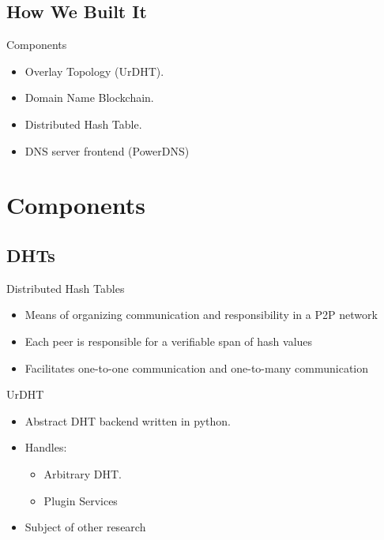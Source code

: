 \documentclass[11pt]{beamer}
\begin{document}
\subsection{How We Built It}

\begin{frame}{Components}

	\begin{itemize}
	
		\item Overlay Topology (UrDHT).
		\item Domain Name Blockchain. 
		\item Distributed Hash Table.
		\item DNS server frontend (PowerDNS)
	\end{itemize}
\end{frame}



\section{Components}

\subsection{DHTs}
\begin{frame}{Distributed Hash Tables}

	\begin{itemize}
		\item  Means of organizing communication and responsibility in a P2P network
		\item  Each peer is responsible for a verifiable span of hash values
		\item  Facilitates one-to-one communication and one-to-many communication
	\end{itemize}

\end{frame}

\begin{frame}{UrDHT}
	\begin{itemize}
		\item Abstract DHT backend written in python.
		\item Handles:
		\begin{itemize}
			\item Arbitrary DHT.
			\item Plugin Services
		\end{itemize}
		\item Subject of other research
	\end{itemize}
\end{frame}
\end{document}
